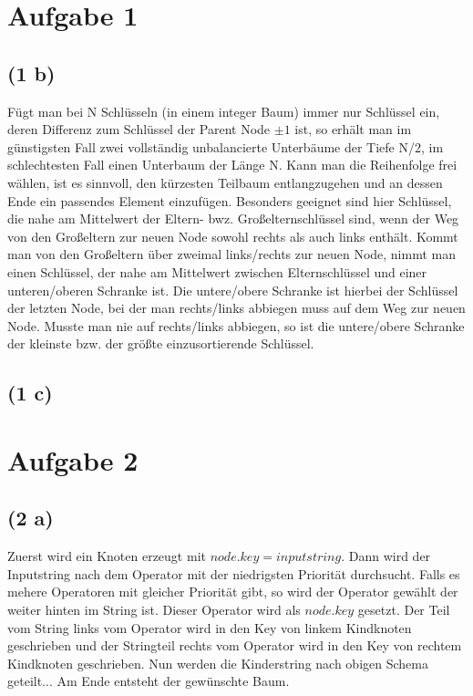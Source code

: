 \documentclass[a4paper]{article}
\begin{document}
\section*{Aufgabe 1}

\subsection*{(1 b)}
Fügt man bei N Schlüsseln (in einem integer Baum) immer nur Schlüssel ein, deren Differenz zum Schlüssel der Parent Node $\pm 1$ ist, so erhält man im günstigsten Fall zwei vollständig unbalancierte Unterbäume der Tiefe N/2, im schlechtesten Fall einen Unterbaum der Länge N. Kann man die Reihenfolge frei wählen, ist es sinnvoll, den kürzesten Teilbaum entlangzugehen und an dessen Ende ein passendes Element einzufügen. Besonders geeignet sind hier Schlüssel, die nahe am Mittelwert der Eltern- bwz. Großelternschlüssel sind, wenn der Weg von den Großeltern zur neuen Node sowohl rechts als auch links enthält. Kommt man von den Großeltern über zweimal links/rechts zur neuen Node, nimmt man einen Schlüssel, der nahe am Mittelwert zwischen Elternschlüssel und einer unteren/oberen Schranke ist. Die untere/obere Schranke ist hierbei der Schlüssel der letzten Node, bei der man rechts/links abbiegen muss auf dem Weg zur neuen Node. Musste man nie auf rechts/links abbiegen, so ist die untere/obere Schranke der kleinste bzw. der größte einzusortierende Schlüssel. 

\subsection*{(1 c)}



\section*{Aufgabe 2}
\subsection*{(2 a)}
Zuerst wird ein Knoten erzeugt mit $node.key = inputstring$. Dann wird der Inputstring nach dem Operator mit der niedrigsten Priorität durchsucht. Falls es mehere Operatoren mit gleicher Priorität gibt, so wird der Operator gewählt der weiter hinten im String ist. Dieser Operator wird als $node.key$ gesetzt. Der Teil vom String links vom Operator wird in den Key von linkem Kindknoten geschrieben und der Stringteil rechts vom Operator wird in den Key von rechtem Kindknoten geschrieben. Nun werden die Kinderstring nach obigen Schema geteilt... Am Ende entsteht der gewünschte Baum.
\end{document}
